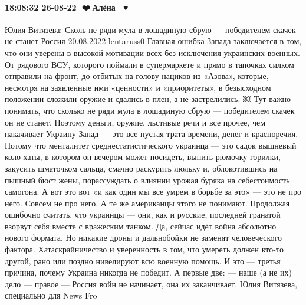  
 
 
 
 

\paragraph{18:08:32 26-08-22 🖤❤️💛Алёна 🤍💙♥️}

Юлия Витязева: Сколь не ряди мула в лошадиную сбрую — победителем скачек не станет
Россия
20.08.2022 lentaruss0
Главная ошибка Запада заключается в том, что они уверены в высокой мотивации всех без исключения украинских военных.
От рядового ВСУ, которого поймали в супермаркете и прямо в тапочках силком отправили на фронт, до отбитых на голову нациков из «Азова», которые, несмотря на заявленные ими «ценности» и «приоритеты», в безысходном положении сложили оружие и сдались в плен, а не застрелились.
￼
Тут важно понимать, что сколько не ряди мула в лошадиную сбрую — победителем скачек он не станет. Поэтому деньги, оружие, льстивые речи и все прочее, чем накачивает Украину Запад — это все пустая трата времени, денег и красноречия.
Потому что менталитет среднестатистического украинца — это садок вышневый коло хаты, в котором он вечером может посидеть, выпить рюмочку горилки, закусить шматочком сальца, смачно раскурить люльку и, облокотившись на пышный бюст жены, порассуждать о влиянии урожая буряка на себестоимость самогона.
А вот это вот «и как один мы все умрем в борьбе за это» — это не про него.
Совсем не про него.
А те же американцы этого не понимают. Продолжая ошибочно считать, что украинцы — они, как и русские, последней гранатой взорвут себя вместе с вражеским танком.
Да, сейчас идёт война абсолютно нового формата. Но никакие дроны и дальнобойки не заменят человеческого фактора. Хатаскрайничество и уверенность в том, что умереть должен кто-то другой, рано или поздно нивелируют всю военную помощь.
И это — третья причина, почему Украина никогда не победит.
А первые две:
— наше (а не их) дело — правое
— Россия войн не начинает, она их заканчивает.
Юлия Витязева, специально для News Fro
